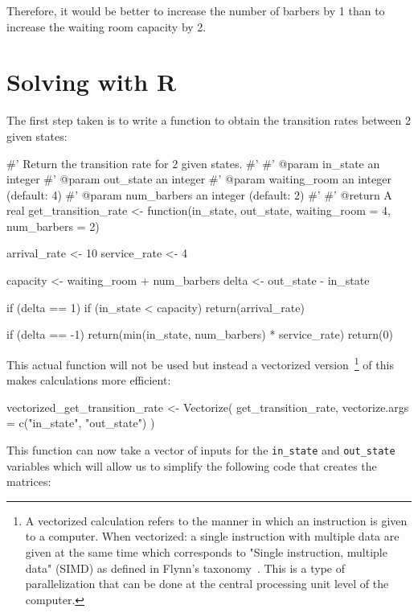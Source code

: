 Therefore, it would be better to increase the number of barbers by 1
than to increase the waiting room capacity by 2.

\section{Solving with R}\label{sec:solving-with-R}

The first step taken is to write a function to obtain the transition rates
between 2 given states:

\begin{Rin}
#' Return the transition rate for 2 given states.
#'
#' @param in_state an integer
#' @param out_state an integer
#' @param waiting_room an integer (default: 4)
#' @param num_barbers an integer  (default: 2)
#'
#' @return A real
get_transition_rate <- function(in_state,
                                out_state,
                                waiting_room = 4,
                                num_barbers = 2){
  arrival_rate <- 10
  service_rate <- 4

  capacity <- waiting_room + num_barbers
  delta <- out_state - in_state

  if (delta == 1) {
    if (in_state < capacity) {
      return(arrival_rate)
    }
  }

  if (delta == -1) {
    return(min(in_state, num_barbers) * service_rate)
  }
  return(0)
}
\end{Rin}

This actual function will not be used but instead a vectorized
version~\footnote{
A vectorized calculation refers to the manner in which an instruction is given
to a computer. When vectorized: a single instruction with multiple
data are given at the same time
which corresponds to "Single instruction, multiple data" (SIMD) as defined in
Flynn's taxonomy~\autocite{flynn1966very}. This is a type of parallelization
that can be done at the central processing unit level of the computer. }
of this
makes calculations more efficient:  %

\begin{Rin}
vectorized_get_transition_rate <- Vectorize(
  get_transition_rate,
  vectorize.args = c("in_state", "out_state")
)
\end{Rin}

This function can now take a vector of inputs for the \texttt{in_state}
and \texttt{out_state} variables which will allow us to simplify the
following code that creates the matrices:

